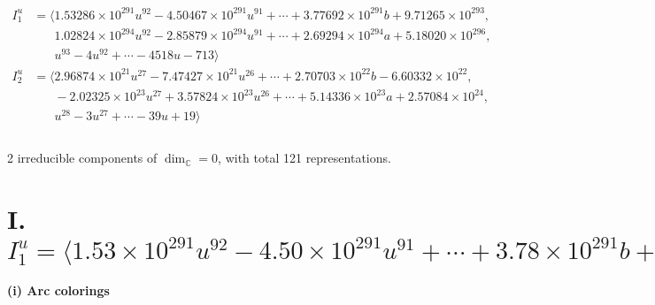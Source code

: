 \documentclass[1p]{elsarticle_modified}
\theoremstyle{definition}
\begin{document}
\begin{align*}
I^u_{1}&=\langle 
1.53286\times10^{291} u^{92}-4.50467\times10^{291} u^{91}+\cdots+3.77692\times10^{291} b+9.71265\times10^{293},\\
\phantom{I^u_{1}}&\phantom{= \langle  }1.02824\times10^{294} u^{92}-2.85879\times10^{294} u^{91}+\cdots+2.69294\times10^{294} a+5.18020\times10^{296},\\
\phantom{I^u_{1}}&\phantom{= \langle  }u^{93}-4 u^{92}+\cdots-4518 u-713\rangle \\
I^u_{2}&=\langle 
2.96874\times10^{21} u^{27}-7.47427\times10^{21} u^{26}+\cdots+2.70703\times10^{22} b-6.60332\times10^{22},\\
\phantom{I^u_{2}}&\phantom{= \langle  }-2.02325\times10^{23} u^{27}+3.57824\times10^{23} u^{26}+\cdots+5.14336\times10^{23} a+2.57084\times10^{24},\\
\phantom{I^u_{2}}&\phantom{= \langle  }u^{28}-3 u^{27}+\cdots-39 u+19\rangle \\
\\
\end{align*}
\raggedright * 2 irreducible components of $\dim_{\mathbb{C}}=0$, with total 121 representations.\\
\newpage
\renewcommand{\arraystretch}{1}
\centering \section*{I. $I^u_{1}= \langle 1.53\times10^{291} u^{92}-4.50\times10^{291} u^{91}+\cdots+3.78\times10^{291} b+9.71\times10^{293},\;1.03\times10^{294} u^{92}-2.86\times10^{294} u^{91}+\cdots+2.69\times10^{294} a+5.18\times10^{296},\;u^{93}-4 u^{92}+\cdots-4518 u-713 \rangle$}
\flushleft \textbf{(i) Arc colorings}\\
\end{document}
